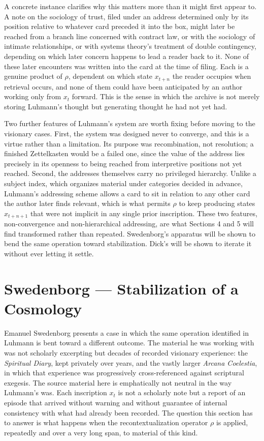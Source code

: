 \documentclass[11pt]{article}
\begin{document}
A concrete instance clarifies why this matters more than it might first appear to. A note on the sociology of trust, filed under an address determined only by its position relative to whatever card preceded it into the box, might later be reached from a branch line concerned with contract law, or with the sociology of intimate relationships, or with systems theory's treatment of double contingency, depending on which later concern happens to lead a reader back to it. None of these later encounters was written into the card at the time of filing. Each is a genuine product of $\rho$, dependent on which state $x_{t+n}$ the reader occupies when retrieval occurs, and none of them could have been anticipated by an author working only from $x_t$ forward. This is the sense in which the archive is not merely storing Luhmann's thought but generating thought he had not yet had.

Two further features of Luhmann's system are worth fixing before moving to the visionary cases. First, the system was designed never to converge, and this is a virtue rather than a limitation. Its purpose was recombination, not resolution; a finished Zettelkasten would be a failed one, since the value of the address lies precisely in its openness to being reached from interpretive positions not yet reached. Second, the addresses themselves carry no privileged hierarchy. Unlike a subject index, which organizes material under categories decided in advance, Luhmann's addressing scheme allows a card to sit in relation to any other card the author later finds relevant, which is what permits $\rho$ to keep producing states $x_{t+n+1}$ that were not implicit in any single prior inscription. These two features, non-convergence and non-hierarchical addressing, are what Sections 4 and 5 will find transformed rather than repeated. Swedenborg's apparatus will be shown to bend the same operation toward stabilization. Dick's will be shown to iterate it without ever letting it settle.

\section{Swedenborg --- Stabilization of a Cosmology}

Emanuel Swedenborg presents a case in which the same operation identified in Luhmann is bent toward a different outcome. The material he was working with was not scholarly excerpting but decades of recorded visionary experience: the \emph{Spiritual Diary}, kept privately over years, and the vastly larger \emph{Arcana Coelestia}, in which that experience was progressively cross-referenced against scriptural exegesis. The source material here is emphatically not neutral in the way Luhmann's was. Each inscription $x_t$ is not a scholarly note but a report of an episode that arrived without warning and without guarantee of internal consistency with what had already been recorded. The question this section has to answer is what happens when the recontextualization operator $\rho$ is applied, repeatedly and over a very long span, to material of this kind.
\end{document}
